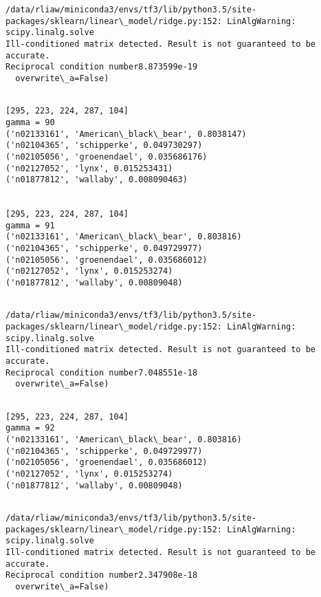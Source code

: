 \documentclass[11pt]{article}
\begin{document}
    \begin{Verbatim}[commandchars=\\\{\}]
/data/rliaw/miniconda3/envs/tf3/lib/python3.5/site-packages/sklearn/linear\_model/ridge.py:152: LinAlgWarning: scipy.linalg.solve
Ill-conditioned matrix detected. Result is not guaranteed to be accurate.
Reciprocal condition number8.873599e-19
  overwrite\_a=False)

    \end{Verbatim}

    \begin{Verbatim}[commandchars=\\\{\}]

[295, 223, 224, 287, 104]
gamma = 90
('n02133161', 'American\_black\_bear', 0.8038147)
('n02104365', 'schipperke', 0.049730297)
('n02105056', 'groenendael', 0.035686176)
('n02127052', 'lynx', 0.015253431)
('n01877812', 'wallaby', 0.008090463)


[295, 223, 224, 287, 104]
gamma = 91
('n02133161', 'American\_black\_bear', 0.803816)
('n02104365', 'schipperke', 0.049729977)
('n02105056', 'groenendael', 0.035686012)
('n02127052', 'lynx', 0.015253274)
('n01877812', 'wallaby', 0.00809048)


    \end{Verbatim}

    \begin{Verbatim}[commandchars=\\\{\}]
/data/rliaw/miniconda3/envs/tf3/lib/python3.5/site-packages/sklearn/linear\_model/ridge.py:152: LinAlgWarning: scipy.linalg.solve
Ill-conditioned matrix detected. Result is not guaranteed to be accurate.
Reciprocal condition number7.048551e-18
  overwrite\_a=False)

    \end{Verbatim}

    \begin{Verbatim}[commandchars=\\\{\}]

[295, 223, 224, 287, 104]
gamma = 92
('n02133161', 'American\_black\_bear', 0.803816)
('n02104365', 'schipperke', 0.049729977)
('n02105056', 'groenendael', 0.035686012)
('n02127052', 'lynx', 0.015253274)
('n01877812', 'wallaby', 0.00809048)


    \end{Verbatim}

    \begin{Verbatim}[commandchars=\\\{\}]
/data/rliaw/miniconda3/envs/tf3/lib/python3.5/site-packages/sklearn/linear\_model/ridge.py:152: LinAlgWarning: scipy.linalg.solve
Ill-conditioned matrix detected. Result is not guaranteed to be accurate.
Reciprocal condition number2.347908e-18
  overwrite\_a=False)

    \end{Verbatim}
\end{document}
